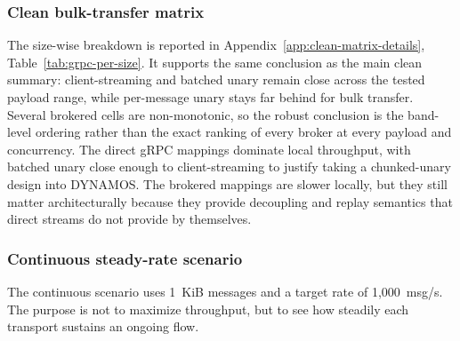 \subsubsection{Clean bulk-transfer matrix}

The size-wise breakdown is reported in Appendix~\ref{app:clean-matrix-details}, Table~\ref{tab:grpc-per-size}. It supports the same conclusion as the main clean summary: client-streaming and batched unary remain close across the tested payload range, while per-message unary stays far behind for bulk transfer. Several brokered cells are non-monotonic, so the robust conclusion is the band-level ordering rather than the exact ranking of every broker at every payload and concurrency. The direct gRPC mappings dominate local throughput, with batched unary close enough to client-streaming to justify taking a chunked-unary design into DYNAMOS. The brokered mappings are slower locally, but they still matter architecturally because they provide decoupling and replay semantics that direct streams do not provide by themselves.

\subsubsection{Continuous steady-rate scenario}

The continuous scenario uses 1~KiB messages and a target rate of 1{,}000~msg/s. The purpose is not to maximize throughput, but to see how steadily each transport sustains an ongoing flow.

